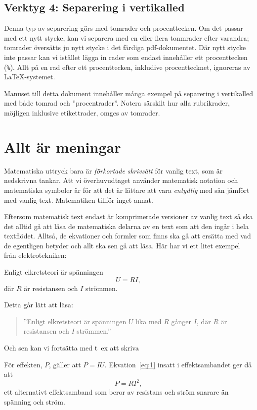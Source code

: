 \documentclass[a4paper,12pt]{article}
\begin{document}
\subsection*{Verktyg 4: Separering i vertikalled}

Denna typ av separering görs med tomrader och procenttecken. Om det
passar med ett nytt stycke, kan vi separera med en eller flera
tonmrader efter varandra; tomrader översätts ju nytt stycke i det
färdiga pdf-dokumentet. Där nytt stycke inte passar kan vi istället
lägga in rader som endast innehåller ett procenttecken
(\verb!%!). Allt på en rad efter ett procenttecken, inkludive
procenttecknet, ignoreras av \LaTeX-systemet. 

Manuset till detta dokument innehåller många exempel på separering
i vertikalled med både tomrad och ''procentrader''. Notera särskilt
hur alla rubrikrader, möjligen inklusive etikettrader, omges av tomrader. 

\section{Allt är meningar}
\label{sect:meningar}

Matematiska uttryck bara är \emph{förkortade skrivsätt} för vanlig
text, som är nedskrivna tankar. Att vi överhuvudtaget använder
matematisk notation och matematiska symboler är för att det är lättare
att vara \emph{entydlig} med sån jämfört med vanlig text. Matematiken
tillför inget annat. 

Eftersom matematisk text endast är komprimerade versioner av vanlig
text så ska det alltid gå att läsa de matematiska delarna av en text som att
den ingår i hela textflödet. Alltså, de ekvationer och formler som
finns ska gå att ersätta med vad de egentligen betyder och allt ska sen
gå att läsa. Här har vi ett litet exempel från elektrotekniken:
%
\begin{framed}
    \noindent Enligt elkretsteori är spänningen
%
    \begin{equation}
        \label{eq:1}  
        U = RI,        
    \end{equation}  
%
    där $R$ är resistansen och $I$ strömmen. 
\end{framed}
%
Detta går lätt att läsa:
%
\begin{quote}
    ''Enligt elkretsteori är spänningen $U$ lika med $R$
    gånger $I$, där $R$ är resistansen och $I$ strömmen.''
\end{quote}
%
Och sen kan vi fortsätta med t~ex att
skriva 
%
\begin{framed}
  \noindent För effekten, $P$, gäller att $P = IU$.
  Ekvation~\ref{eq:1} insatt i effektsambandet ger då att  
%
    \begin{equation}
        P = RI^2,
    \end{equation}
%
    ett alternativt effektsamband som beror av resistans och ström
    snarare än spänning och ström.
\end{framed}
\end{document}
